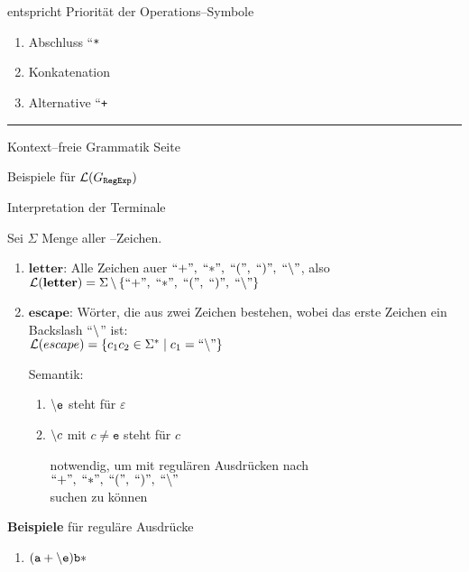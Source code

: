 \begin{slide}{}
entspricht Priorit\"at der Operations--Symbole
\begin{enumerate}
\item Abschluss ``\texttt{*}\cq
\item Konkatenation
\item Alternative ``\texttt{+}\cq
\end{enumerate}

\vspace*{\fill}
\tiny \addtocounter{mypage}{1}
\rule{17cm}{1mm}
Kontext--freie Grammatik  \hspace*{\fill} Seite 
\end{slide}


\begin{slide}{}
\normalsize

\begin{center}
Beispiele f\"ur ${\cal L}(G_{\mathtt{RegExp}})$
\end{center}
\vspace*{0.5cm}

\footnotesize
Interpretation der Terminale

Sei $\Sigma$ Menge aller --Zeichen. 
\begin{enumerate}
\item $\mathbf{letter}$: Alle Zeichen au\3er $``\mathtt{+}\cq,\; ``\mathtt{*}\cq,\; ``\mathtt{(}\cq,\;
``\mathtt{)}\cq,\; ``\mathtt{\symbol{92}}\cq$, also \\[0.3cm]
      \hspace*{1.3cm} $\Ll(\mathbf{letter}) = \Sigma \,\backslash\, \{ ``\mathtt{+}\cq,\; ``\mathtt{*}\cq,\; ``\mathtt{(}\cq,\;
``\mathtt{)}\cq,\; ``\mathtt{\symbol{92}}\cq \}$
\item $\mathbf{escape}$: W\"orter, die aus zwei Zeichen bestehen, wobei das erste Zeichen
      ein Backslash ``$\symbol{92}$'' ist: \\[0.3cm]
      \hspace*{1.3cm} $\Ll(escape) = \{ c_1c_2 \in \Sigma^* \;|\; c_1 = ``\mathtt{\symbol{92}}\cq \}$

      Semantik:
      \begin{enumerate}
      \item $\mathtt{\symbol{92}e}$ steht f\"ur $\varepsilon$
      \item $\mathtt{\symbol{92}}c$ mit $c \not= \mathtt{e}$ steht f\"ur $c$

            notwendig, um mit regul\"aren Ausdr\"ucken nach \\[0.3cm]
            \hspace*{1.3cm} $``\mathtt{+}\cq,\; ``\mathtt{*}\cq,\; ``\mathtt{(}\cq,\; ``\mathtt{)}\cq,\; ``\mathtt{\symbol{92}}\cq$ \\[0.3cm]
            suchen zu k\"onnen
      \end{enumerate}
\end{enumerate}
\textbf{Beispiele} f\"ur regul\"are Ausdr\"ucke
\begin{enumerate}
\item $\mathtt{(a+\symbol{92}e)b*}$
    

\end{enumerate}
\end{slide}
